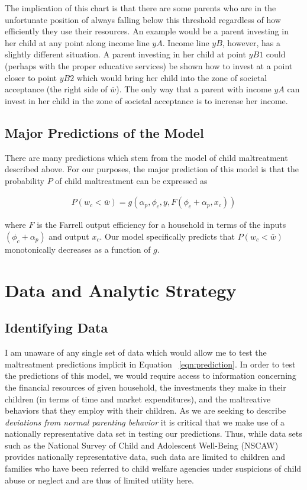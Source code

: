 \documentclass[1p, review]{elsarticle}\usepackage[]{graphicx}\usepackage[]{color}
\begin{document}
The implication of this chart is that there are some parents who are in the unfortunate position of always falling below this threshold regardless of how efficiently they use their resources. An example would be a parent investing in her child at any point along income line $yA$. Income line $yB$, however, has a slightly different situation. A parent investing in her child at point $yB1$ could (perhaps with the proper educative services) be shown how to invest at a point closer to point $yB2$ which would bring her child into the zone of societal acceptance (the right side of $\bar{w}$). The only way that a parent with income $yA$ can invest in her child in the zone of societal acceptance is to increase her income. 

\subsection{Major Predictions of the Model}

There are many predictions which stem from the model of child maltreatment described above. For our purposes, the major prediction of this model is that the probability $P$ of child maltreatment can be expressed as 

\begin{align}\label{eqn:prediction}
P(w_c < \bar{w})=g(\alpha_p, \phi_c, y, F(\phi_c + \alpha_p, x_c))
\end{align} 

where $F$ is the Farrell output efficiency for a household \citep{Farrell1957} in terms of the inputs $(\phi_c + \alpha_p)$ and output $x_c$. Our model specifically predicts that $P(w_c < \bar{w})$ monotonically decreases as a function of $g$. 

\section{Data and Analytic Strategy}
\label{sec:analysis}

\subsection{Identifying Data}

I am unaware of any single set of data which would allow me to test the maltreatment predictions implicit in Equation ~\ref{eqn:prediction}. In order to test the predictions of this model, we would require access to information concerning the financial resources of given household, the investments they make in their children (in terms of time and market expenditures), and the maltreative behaviors that they employ with their children. As we are seeking to describe \emph{deviations from normal parenting behavior} it is critical that we make use of a nationally representative data set in testing our predictions. Thus, while data sets such as the National Survey of Child and Adolescent Well-Being (NSCAW) provides nationally representative data, such data are limited to children and families who have been referred to child welfare agencies under suspicions of child abuse or neglect and are thus of limited utility here. 
\end{document}
